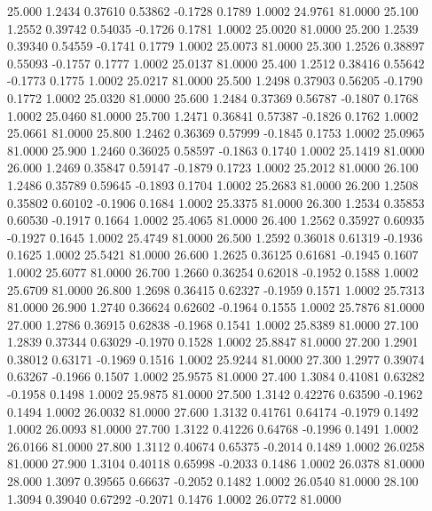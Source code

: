   25.000   1.2434   0.37610   0.53862  -0.1728   0.1789   1.0002  24.9761  81.0000
  25.100   1.2552   0.39742   0.54035  -0.1726   0.1781   1.0002  25.0020  81.0000
  25.200   1.2539   0.39340   0.54559  -0.1741   0.1779   1.0002  25.0073  81.0000
  25.300   1.2526   0.38897   0.55093  -0.1757   0.1777   1.0002  25.0137  81.0000
  25.400   1.2512   0.38416   0.55642  -0.1773   0.1775   1.0002  25.0217  81.0000
  25.500   1.2498   0.37903   0.56205  -0.1790   0.1772   1.0002  25.0320  81.0000
  25.600   1.2484   0.37369   0.56787  -0.1807   0.1768   1.0002  25.0460  81.0000
  25.700   1.2471   0.36841   0.57387  -0.1826   0.1762   1.0002  25.0661  81.0000
  25.800   1.2462   0.36369   0.57999  -0.1845   0.1753   1.0002  25.0965  81.0000
  25.900   1.2460   0.36025   0.58597  -0.1863   0.1740   1.0002  25.1419  81.0000
  26.000   1.2469   0.35847   0.59147  -0.1879   0.1723   1.0002  25.2012  81.0000
  26.100   1.2486   0.35789   0.59645  -0.1893   0.1704   1.0002  25.2683  81.0000
  26.200   1.2508   0.35802   0.60102  -0.1906   0.1684   1.0002  25.3375  81.0000
  26.300   1.2534   0.35853   0.60530  -0.1917   0.1664   1.0002  25.4065  81.0000
  26.400   1.2562   0.35927   0.60935  -0.1927   0.1645   1.0002  25.4749  81.0000
  26.500   1.2592   0.36018   0.61319  -0.1936   0.1625   1.0002  25.5421  81.0000
  26.600   1.2625   0.36125   0.61681  -0.1945   0.1607   1.0002  25.6077  81.0000
  26.700   1.2660   0.36254   0.62018  -0.1952   0.1588   1.0002  25.6709  81.0000
  26.800   1.2698   0.36415   0.62327  -0.1959   0.1571   1.0002  25.7313  81.0000
  26.900   1.2740   0.36624   0.62602  -0.1964   0.1555   1.0002  25.7876  81.0000
  27.000   1.2786   0.36915   0.62838  -0.1968   0.1541   1.0002  25.8389  81.0000
  27.100   1.2839   0.37344   0.63029  -0.1970   0.1528   1.0002  25.8847  81.0000
  27.200   1.2901   0.38012   0.63171  -0.1969   0.1516   1.0002  25.9244  81.0000
  27.300   1.2977   0.39074   0.63267  -0.1966   0.1507   1.0002  25.9575  81.0000
  27.400   1.3084   0.41081   0.63282  -0.1958   0.1498   1.0002  25.9875  81.0000
  27.500   1.3142   0.42276   0.63590  -0.1962   0.1494   1.0002  26.0032  81.0000
  27.600   1.3132   0.41761   0.64174  -0.1979   0.1492   1.0002  26.0093  81.0000
  27.700   1.3122   0.41226   0.64768  -0.1996   0.1491   1.0002  26.0166  81.0000
  27.800   1.3112   0.40674   0.65375  -0.2014   0.1489   1.0002  26.0258  81.0000
  27.900   1.3104   0.40118   0.65998  -0.2033   0.1486   1.0002  26.0378  81.0000
  28.000   1.3097   0.39565   0.66637  -0.2052   0.1482   1.0002  26.0540  81.0000
  28.100   1.3094   0.39040   0.67292  -0.2071   0.1476   1.0002  26.0772  81.0000
